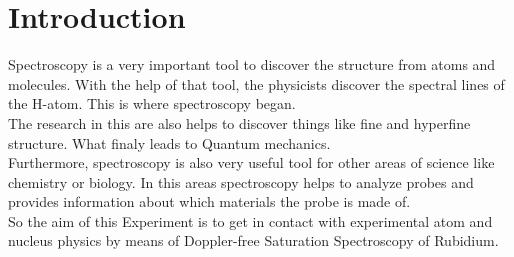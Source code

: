 
\chapter{Introduction}
\label{chap:intro}

Spectroscopy is a very important tool to discover the structure from atoms and molecules. With the help of that tool, the physicists discover the spectral lines of the H-atom. This is where spectroscopy began. \\
The research in this are also helps to discover things like fine and hyperfine structure. What finaly leads to Quantum mechanics.\\
Furthermore, spectroscopy is also very useful tool for other areas of science like chemistry or biology. In this areas spectroscopy helps to analyze probes and provides information about which materials the probe is made of.\\
So the aim of this Experiment is to get in contact with experimental atom and nucleus physics by means of Doppler-free  Saturation Spectroscopy of Rubidium.